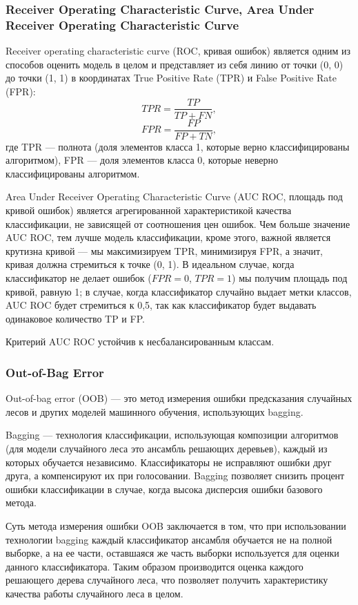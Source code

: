 \documentclass[14pt, a4paper, oneside]{extarticle}
\begin{document}
\subsubsection{Receiver Operating Characteristic Curve, Area Under Receiver Operating Characteristic Curve}
Receiver operating characteristic curve (ROC, кривая ошибок) является одним из способов оценить модель в целом и представляет из себя линию от точки (0, 0) до точки (1, 1) в координатах True Positive Rate (TPR) и False Positive Rate (FPR):
$$TPR = \frac{TP}{TP+FN},$$
$$FPR = \frac{FP}{FP+TN},$$
где TPR --- полнота (доля элементов класса 1, которые верно классифицированы алгоритмом), FPR --- доля элементов класса 0, которые неверно классифицированы алгоритмом.

Area Under Receiver Operating Characteristic Curve (AUC ROC, площадь под кривой ошибок) является агрегированной характеристикой качества классификации, не зависящей от соотношения цен ошибок. Чем больше значение AUC ROC, тем лучше модель классификации, кроме этого, важной является крутизна кривой --- мы максимизируем TPR, минимизируя FPR, а значит, кривая должна стремиться к точке (0, 1). В идеальном случае, когда классификатор не делает ошибок ($FPR = 0$, $TPR = 1$) мы получим площадь под кривой, равную 1; в случае, когда классификатор случайно выдает метки классов, AUC ROC будет стремиться к 0,5, так как классификатор будет выдавать одинаковое количество TP и FP.

Критерий AUC ROC устойчив к несбалансированным классам.

\subsubsection{Out-of-Bag Error}
Out-of-bag error (OOB) --- это метод измерения ошибки предсказания случайных лесов и других моделей машинного обучения, использующих bagging.

Bagging --- технология классификации, использующая композиции алгоритмов (для модели случайного леса это ансамбль решающих деревьев), каждый из которых обучается независимо. Классификаторы не исправляют ошибки друг друга, а компенсируют их при голосовании. Bagging позволяет снизить процент ошибки классификации в случае, когда высока дисперсия ошибки базового метода.

Суть метода измерения ошибки OOB заключается в том, что при использовании технологии bagging каждый классификатор ансамбля обучается не на полной выборке, а на ее части, оставшаяся же часть выборки используется для оценки данного классификатора. Таким образом производится оценка каждого решающего дерева случайного леса, что позволяет получить характеристику качества работы случайного леса в целом.
\end{document}
